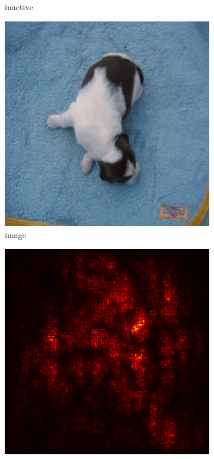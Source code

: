 \documentclass[preprint,12pt]{elsarticle}
\begin{document}
\begin{figure}
\begin{subfigure}{0.14\textwidth}
        \caption{inactive}
    \end{subfigure}
    \hfill
    \begin{subfigure}{0.14\linewidth}
        \centering
        \includegraphics[width=\linewidth]{../visualizations/examples/imagenette/cnn/images/3.png}
        \caption{image}
    \end{subfigure}
    \hfill
    \begin{subfigure}{0.14\linewidth}
        \centering
        \includegraphics[width=\linewidth]{../visualizations/examples/imagenette/cnn/saliency_map/3.png}

\end{subfigure}
\end{figure}
\end{document}
